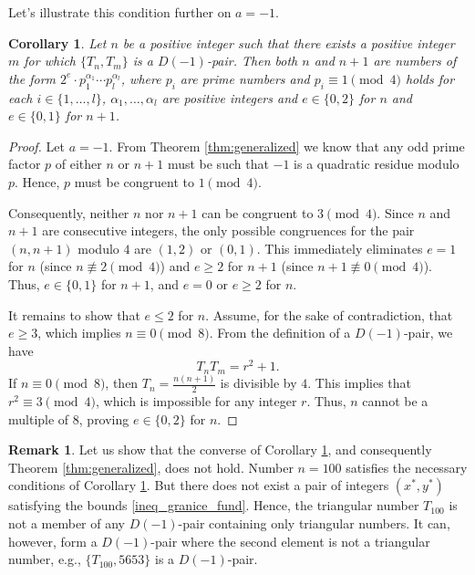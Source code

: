 \documentclass[12pt]{amsart}
\newtheorem{kor}[theorem]{Corollary}
\theoremstyle{definition}
\newtheorem*{rem}{Remark}
\begin{document}
Let's illustrate this condition further on $a=-1$.

\begin{kor}\label{kor:minus1}
Let $n$ be a positive integer such that there exists a positive integer $m$ for which $\{T_n,T_m\}$ is a $D(-1)$-pair. Then both $n$ and $n+1$ are numbers of the form $2^e\cdot p_1^{\alpha_1}\cdots p_l^{\alpha_l}$, where $p_i$ are prime numbers and $p_i\equiv 1\pmod{4}$ holds for each $i\in\{1,\dots,l\}$, $\alpha_1,\dots,\alpha_l$ are positive integers and $e\in\{0,2\}$ for $n$ and $e\in\{0,1\}$ for $n+1$.
\end{kor}
\begin{proof}
Let $a=-1$. From Theorem \ref{thm:generalized} we know that any odd prime factor $p$ of either $n$ or $n+1$ must be such that $-1$ is a quadratic residue modulo $p$. Hence, $p$ must be congruent to $1 \pmod{4}$.

Consequently, neither $n$ nor $n+1$ can be congruent to $3 \pmod{4}$. Since $n$ and $n+1$ are consecutive integers, the only possible congruences for the pair $(n, n+1)$ modulo $4$ are $(1, 2)$ or $(0, 1)$. This immediately eliminates $e=1$ for $n$ (since $n \not\equiv 2 \pmod{4}$) and $e \geq 2$ for $n+1$ (since $n+1 \not\equiv 0 \pmod{4}$). Thus, $e \in \{0, 1\}$ for $n+1$, and $e=0$ or $e \geq 2$ for $n$.

It remains to show that $e \leq 2$ for $n$. Assume, for the sake of contradiction, that $e \geq 3$, which implies $n \equiv 0 \pmod{8}$. From the definition of a $D(-1)$-pair, we have
$$ T_n T_m = r^2 + 1. $$
If $n \equiv 0 \pmod{8}$, then $T_n=\frac{n(n+1)}{2}$ is divisible by $4$. This implies that $r^2 \equiv 3 \pmod{4}$, which is impossible for any integer $r$. Thus, $n$ cannot be a multiple of $8$, proving $e \in \{0, 2\}$ for $n$.
\end{proof}

\begin{rem} 
 Let us show that the converse of Corollary \ref{kor:minus1}, and consequently Theorem \ref{thm:generalized}, does not hold. Number $n=100$ satisfies the necessary conditions of Corollary \ref{kor:minus1}. But there does not exist a pair of integers $(x^*,y^*)$ satisfying the bounds \eqref{ineq_granice_fund}. Hence, the triangular number $T_{100}$ is not a member of any $D(-1)$-pair containing only triangular numbers. It can, however, form a $D(-1)$-pair where the second element is not a triangular number, e.g., $\{T_{100}, 5653\}$ is a $D(-1)$-pair.
\end{rem}
\end{document}
